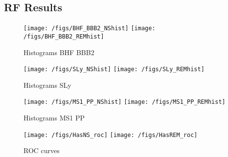 \subsection{RF Results}

\begin{figure}
\centering
\texttt{[image: /figs/BHF\_BBB2\_NShist]}
\texttt{[image: /figs/BHF\_BBB2\_REMhist]}
\caption{\label{fig:RF_hist_BHFBBB2} Histograms BHF BBB2}
\end{figure}

\begin{figure}
\centering
\texttt{[image: /figs/SLy\_NShist]}
\texttt{[image: /figs/SLy\_REMhist]}
\caption{\label{fig:RF_hist_SLY} Histograms SLy}
\end{figure}

\begin{figure}
\centering
\texttt{[image: /figs/MS1\_PP\_NShist]}
\texttt{[image: /figs/MS1\_PP\_REMhist]}
\caption{\label{fig:RF_hist_MS1PP} Histograms MS1 PP}
\end{figure}

\begin{figure}
\centering
\texttt{[image: /figs/HasNS\_roc]}
\texttt{[image: /figs/HasREM\_roc]}
\caption{\label{fig:RF_roc} ROC curves}
\end{figure}
